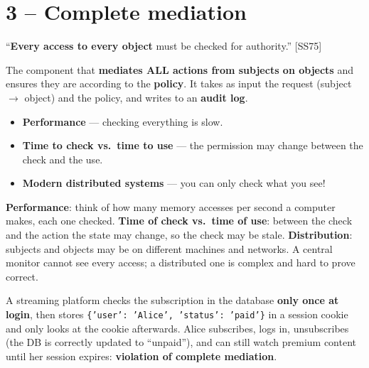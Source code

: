 \section{3 -- Complete mediation}

\begin{defnbox}[title=Complete mediation]
``\textbf{Every access to every object} must be checked for authority.'' [SS75]
\end{defnbox}

\begin{defnbox}[title=Reference monitor]
The component that \textbf{mediates ALL actions from subjects on objects} and ensures
they are according to the \textbf{policy}. It takes as input the request
(subject $\to$ object) and the policy, and writes to an \textbf{audit log}.
\end{defnbox}

\begin{warnbox}[title=Difficult to implement]
\begin{itemize}
  \item \textbf{Performance} --- checking everything is slow.
  \item \textbf{Time to check vs.\ time to use} --- the permission may change between
        the check and the use.
  \item \textbf{Modern distributed systems} --- you can only check what you see!
\end{itemize}
\end{warnbox}

\begin{rembox}[title=Why each difficulty]
\textbf{Performance}: think of how many memory accesses per second a computer makes, each one
checked. \textbf{Time of check vs.\ time of use}: between the check and the action the state may
change, so the check may be stale. \textbf{Distribution}: subjects and objects may be on
different machines and networks. A central monitor cannot see every access; a distributed one is
complex and hard to prove correct.
\end{rembox}

\begin{exbox}[title=Missing mediation --- the ``Gold Member'' cookie]
A streaming platform checks the subscription in the database \textbf{only once at
login}, then stores \texttt{\{'user': 'Alice', 'status': 'paid'\}} in a session cookie
and only looks at the cookie afterwards. Alice subscribes, logs in, unsubscribes (the DB
is correctly updated to ``unpaid''), and can still watch premium content until her
session expires: \textbf{violation of complete mediation}.
\end{exbox}

